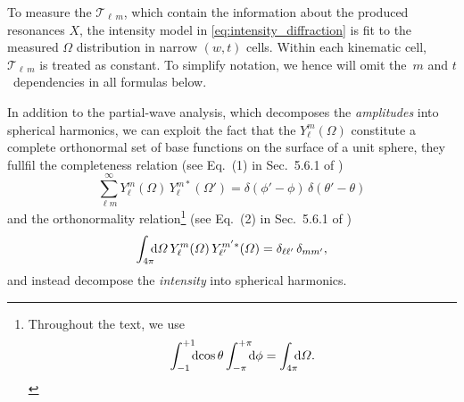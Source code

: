 To measure the $\mathcal{T\!}_{\ell\, m}$, which contain the information
about the produced resonances $X$, the intensity model in
\cref{eq:intensity_diffraction} is fit to the measured $\Omega$
distribution in narrow $(w, t)$ cells.  Within each kinematic cell,
$\mathcal{T\!}_{\ell\, m}$ is treated as constant.  To simplify notation,
we hence will omit the~$m$ and $t$~dependencies in all formulas below.

In addition to the partial-wave analysis, which decomposes the
\emph{amplitudes} into spherical harmonics, we can exploit the fact
that the $Y_\ell^m(\Omega)$ constitute a complete orthonormal set of
base functions on the surface of a unit sphere, \ie they fullfil the
completeness relation (see Eq.~(1) in Sec.~5.6.1 of
)
\begin{equation}
  \label{eq:spherical_harm_complete}
  \sum_{\ell m}^\infty Y_\ell^m(\Omega)\, Y_\ell^{m *}(\Omega')
  = \delta(\phi' - \phi)\, \delta(\theta' - \theta)
\end{equation}
and the orthonormality relation\footnote{%
Throughout the text, we use
\begin{equation}
  \int_{-1}^{+1}\!\!\! \dif{\cos\theta} \int_{-\pi}^{+\pi}\!\!\! \dif{\phi}
  = \int_{4 \pi}\!\!\! \dif{\Omega}.
\end{equation}
} (see Eq.~(2) in Sec.~5.6.1 of )
\begin{equation}
  \label{eq:spherical_harm_orthonorm}
  \int_{4 \pi}\!\!\! \dif{\Omega}\, Y_\ell^m(\Omega)\, Y_{\ell'}^{m' *}(\Omega)
  = \delta_{\ell \ell'}\, \delta_{m m'},
\end{equation}
and instead decompose the \emph{intensity} into spherical harmonics.

